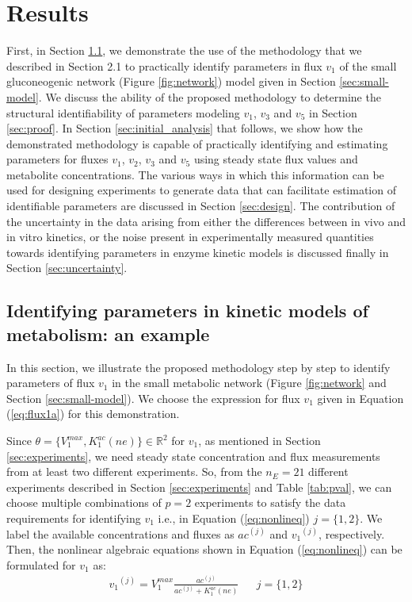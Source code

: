 \documentclass[10pt]{article}
\begin{document}
	\section{Results}
	First, in Section \ref{sec:example}, we demonstrate the use of the methodology that we described in Section 2.1 to practically identify parameters in flux $v_1$ of the small gluconeogenic network (Figure \ref{fig:network}) model given in Section \ref{sec:small-model}. 
	We discuss the ability of the proposed methodology to determine the structural identifiability of parameters modeling $v_1$, $v_3$ and $v_5$ in Section \ref{sec:proof}. 	
	In Section \ref{sec:initial_analysis} that follows, we show how the demonstrated methodology is capable of practically identifying and estimating parameters for fluxes $v_1$, $v_2$, $v_3$ and $v_5$ using steady state flux values and metabolite concentrations. 
	The various ways in which this information can be used for designing experiments to generate data that can facilitate estimation of identifiable parameters are discussed in Section \ref{sec:design}.
	The contribution of the uncertainty in the data arising from either the differences between in vivo and in vitro kinetics, or the noise present in experimentally measured quantities towards identifying parameters in enzyme kinetic models is discussed finally in Section \ref{sec:uncertainty}.
		
	\subsection{Identifying parameters in kinetic models of metabolism: an example}\label{sec:example}	
	In this section, we illustrate the proposed methodology step by step to identify parameters of flux $v_1$ in the small metabolic network (Figure \ref{fig:network} and Section \ref{sec:small-model}). We choose the expression for flux $v_1$ given in Equation (\ref{eq:flux1a}) for this demonstration. 
	
	Since $\theta = \{V_1^{max}, K_1^{ac} (ne)\} \in \mathbb{R}^2$ for $v_1$, as mentioned in Section \ref{sec:experiments}, we need steady state concentration and flux measurements from at least two different experiments. So, from the $n_E = 21$ different experiments described in Section \ref{sec:experiments} and Table \ref{tab:pval}, we can choose multiple combinations of $p = 2$ experiments to satisfy the data requirements for identifying $v_1$ i.e., in Equation (\ref{eq:nonlineq}) $j = \{1, 2\}$. We label the available concentrations and fluxes as ${ac}^{(j)}$ and ${v_1}^{(j)}$, respectively. Then, the nonlinear algebraic equations shown in Equation (\ref{eq:nonlineq}) can be formulated for $v_1$ as:
	\begin{align*}%
	{v_1}^{(j)} = V_{1}^{max}\frac{ac^{(j)}}{ac^{(j)}+K_{1}^{ac}(ne)} &&  j=\{1, 2\}
	\end{align*}
	
\end{document}
